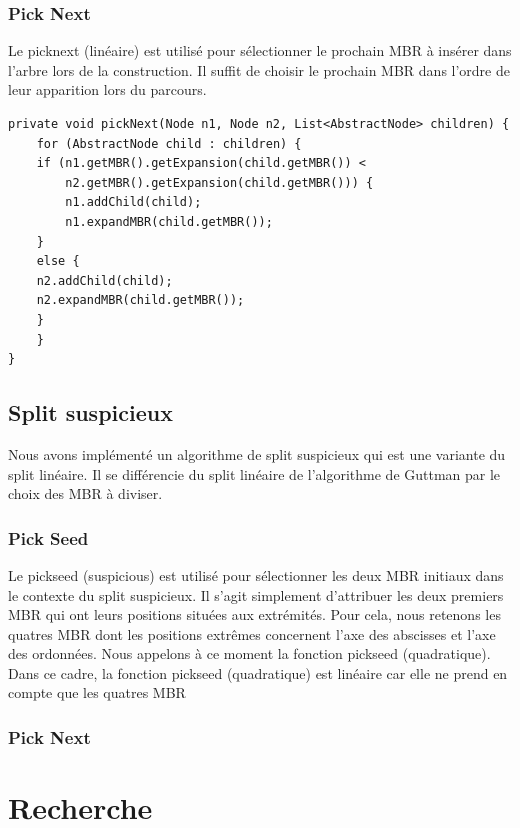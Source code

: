 \documentclass {article}
\begin{document}
\subsubsection {Pick Next}

Le picknext (linéaire) est utilisé pour sélectionner le prochain MBR à insérer dans l'arbre lors de la construction.
Il suffit de choisir le prochain MBR dans l'ordre de leur apparition lors du parcours.


\begin{verbatim}
private void pickNext(Node n1, Node n2, List<AbstractNode> children) {
    for (AbstractNode child : children) {
	if (n1.getMBR().getExpansion(child.getMBR()) <
		n2.getMBR().getExpansion(child.getMBR())) {
	    n1.addChild(child);
	    n1.expandMBR(child.getMBR());
	}
	else {
	n2.addChild(child);
	n2.expandMBR(child.getMBR());
	}
    }
}
\end{verbatim}

\subsection {Split suspicieux}
Nous avons implémenté un algorithme de split suspicieux qui est une variante du split linéaire.
Il se différencie du split linéaire de l'algorithme de Guttman par le choix des MBR à diviser.

\subsubsection {Pick Seed}
Le pickseed (suspicious) est utilisé pour sélectionner les deux MBR initiaux dans le contexte du split suspicieux.
Il s'agit simplement d'attribuer les deux premiers MBR qui ont leurs positions situées aux extrémités.
Pour cela, nous retenons les quatres MBR dont les positions extrêmes concernent l'axe des abscisses et 
l'axe des ordonnées.
Nous appelons à ce moment la fonction pickseed (quadratique).
Dans ce cadre, la fonction pickseed (quadratique) est linéaire car elle ne prend en compte que les quatres MBR
\subsubsection {Pick Next}



\section {Recherche}\label{recherche}
\end{document}
